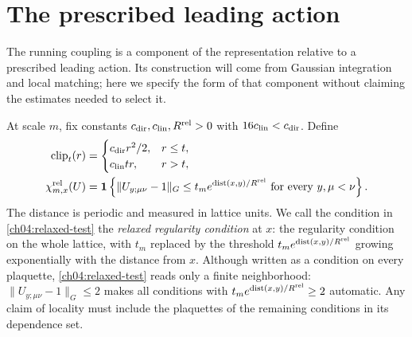 \section{The prescribed leading action}
\label{ch04:leading-action}

The running coupling is a component of the representation relative to a prescribed leading
action. Its construction will come from Gaussian integration and local
matching; here we specify the form of that component without claiming
the estimates needed to select it.

At scale $m$, fix constants $c_{\rm dir},c_{\rm lin},R^{\rm rel}>0$ with
$16c_{\rm lin}<c_{\rm dir}$. Define
\begin{align}
 \operatorname{clip}_t(r)&=
 \begin{cases}
 c_{\rm dir}r^2/2,&r\le t,\\
 c_{\rm lin}tr,&r>t,
 \end{cases}
 \label{ch04:clip}\\
 \chi^{\rm rel}_{m,x}(U)&=
 \mathbf1\left\{\|U_{y;\mu\nu}-1\|_G
       \le t_m e^{\operatorname{dist}(x,y)/R^{\rm rel}}
              \text{ for every }y,\mu<\nu\right\}.
 \label{ch04:relaxed-test}
\end{align}
The distance is periodic and measured in lattice units. We call the condition in \eqref{ch04:relaxed-test} the \emph{relaxed regularity condition} at $x$: the regularity condition on the whole lattice, with $t_m$ replaced by the threshold $t_m e^{\operatorname{dist}(x,y)/R^{\rm rel}}$ growing exponentially with the distance from $x$. Although written
as a condition on every plaquette, \eqref{ch04:relaxed-test} reads only a finite
neighborhood: $\|U_{y;\mu\nu}-1\|_G\le2$ makes all conditions with
$t_m e^{\operatorname{dist}(x,y)/R^{\rm rel}}\ge2$ automatic. Any claim of
locality must include the plaquettes of the remaining conditions in its dependence
set.

